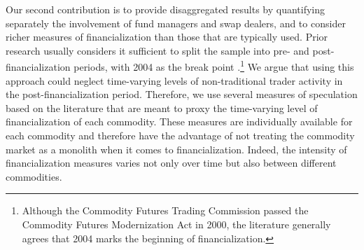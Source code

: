 \documentclass[12pt]{article}
\begin{document}
Our second contribution is to provide disaggregated results by quantifying separately the involvement of fund managers and swap dealers, and to consider richer measures of financialization than those that are typically used. Prior research usually considers it sufficient to split the sample into pre- and post-financialization periods, with 2004 as the break point \citep*[see e.g., ][]{buyukcsahin2010matters, kilian2014role,brunetti2016speculators,irwin2012financialization,stoll2010commodity,alquist2013role}.\footnote{Although the Commodity Futures Trading Commission passed the Commodity Futures Modernization Act in 2000, the literature generally agrees that 2004 marks the beginning of financialization.} We argue that using this approach could neglect time-varying levels of non-traditional trader activity in the post-financialization period. Therefore, we use several measures of speculation based on the literature that are meant to proxy the time-varying level of financialization of each commodity. These measures are individually available for each commodity and therefore have the advantage of not treating the commodity market as a monolith when it comes to financialization. Indeed, the intensity of financialization measures varies not only over time but also between different commodities.  
\end{document}
